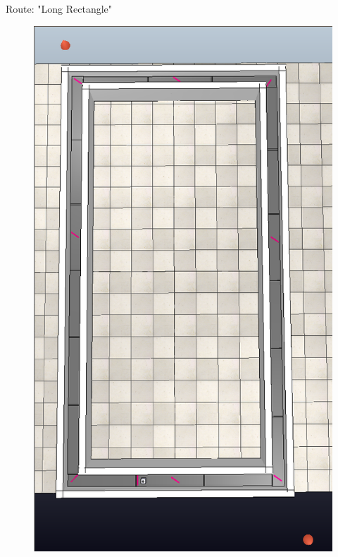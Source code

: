 \documentclass[10pt]{beamer}
\begin{document}
\begin{frame}{Route: "Long Rectangle"}
    \begin{figure}
        \centering
        \includegraphics[angle=90,width=\linewidth]{routes/long_rectangle.png}
    \end{figure}
\end{frame}
\end{document}
